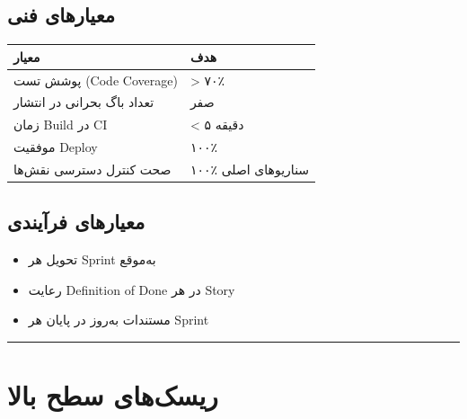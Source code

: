 \documentclass[12pt, a4paper]{article}
\begin{document}
\subsection{معیارهای فنی}

{\def\LTcaptype{none} %
\begin{longtable}[]{@{}ll@{}}
\toprule\noalign{}
معیار & هدف \\
\midrule\noalign{}
\endhead
\bottomrule\noalign{}
\endlastfoot
پوشش تست (Code Coverage) & \textgreater{} ۷۰٪ \\
تعداد باگ بحرانی در انتشار & صفر \\
زمان Build در CI & \textless{} ۵ دقیقه \\
موفقیت Deploy & ۱۰۰٪ \\
صحت کنترل دسترسی نقش‌ها & ۱۰۰٪ سناریوهای اصلی \\
\end{longtable}
}

\subsection{معیارهای فرآیندی}

\begin{itemize}
\tightlist
\item
  تحویل هر Sprint به‌موقع
\item
  رعایت Definition of Done در هر Story
\item
  مستندات به‌روز در پایان هر Sprint
\end{itemize}

\begin{center}\rule{0.5\linewidth}{0.5pt}\end{center}

\section{ریسک‌های سطح بالا}
\end{document}

